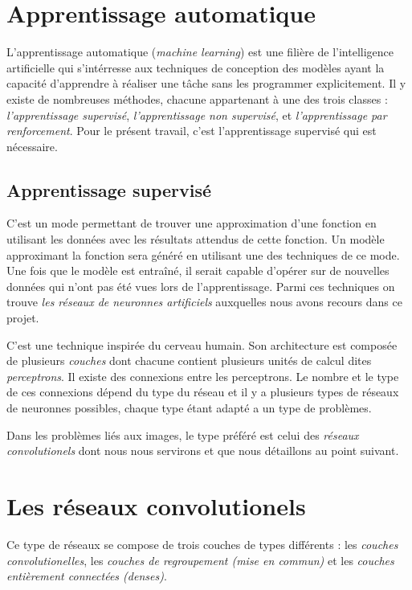 \section{Apprentissage automatique}

L'apprentissage automatique (\emph{machine learning}) est une filière de
l'intelligence artificielle qui s'intérresse aux techniques de conception des
modèles ayant la capacité d'apprendre à réaliser une tâche sans les programmer
explicitement. Il y existe de nombreuses méthodes, chacune appartenant à
une des trois classes :
\emph{l'apprentissage supervisé}, \emph{l'apprentissage non supervisé}, et
\emph{l'apprentissage par renforcement}.
Pour le présent travail, c'est l'apprentissage supervisé qui est nécessaire.

\subsection{Apprentissage supervisé}

C'est un mode permettant de trouver une approximation d'une fonction en utilisant
les données avec les résultats attendus de cette fonction. Un modèle approximant
la fonction sera généré en utilisant une des techniques de ce mode. Une fois que
le modèle est entraîné, il serait capable d'opérer sur de nouvelles données qui
n'ont pas été vues lors de l'apprentissage. Parmi ces techniques on trouve
\emph{les réseaux de neuronnes artificiels} auxquelles nous avons recours dans
ce projet.

C'est une technique inspirée du cerveau humain. Son architecture est composée de
plusieurs \emph{couches} dont chacune contient plusieurs unités de calcul dites
\emph{perceptrons}.
Il existe des connexions entre les perceptrons. Le nombre et le type de ces
connexions dépend du type du réseau et il y a plusieurs types de réseaux de
neuronnes possibles, chaque type étant adapté a un type de problèmes.

Dans les
problèmes liés aux images, le type préféré est celui des \emph{réseaux convolutionels}
dont nous nous servirons et que nous détaillons au point suivant.

\section{Les réseaux convolutionels}

Ce type de réseaux se compose de trois couches de
types différents : les \emph{couches convolutionelles}, les
\emph{couches de regroupement (mise en commun)} et les
\emph{couches entièrement connectées (denses)}.

